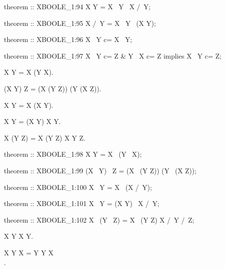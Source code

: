 \begin{paracol}{2}
\begin{mizar}
theorem :: XBOOLE_1:94
  X \/ Y = X \+\ Y \+\ X /\ Y;

theorem :: XBOOLE_1:95
  X /\ Y = X \+\ Y \+\ (X \/ Y);

theorem :: XBOOLE_1:96
  X \ Y c= X \+\ Y;

theorem :: XBOOLE_1:97
  X \ Y c= Z & Y \ X c= Z 
  implies X \+\ Y c= Z;
\end{mizar}

\switchcolumn*\ensurevspace{5cm}

\begin{theorem}
  X \cup Y = X \dotminus (Y \setminus X).
\end{theorem}

\begin{theorem}
  (X \dotminus Y) \setminus Z = (X \setminus (Y \cup Z)) \cup (Y \setminus (X \cup Z)).
\end{theorem}

\begin{theorem}
  X \setminus Y = X \dotminus (X \cap Y).
\end{theorem}

\begin{theorem}
  X \dotminus Y = (X \cup Y) \setminus X \cap Y.
\end{theorem}

\begin{theorem}
  X \setminus (Y \dotminus Z) = X \setminus (Y \cup Z) \cup X \cap Y \cap Z.
\end{theorem}

\switchcolumn

\begin{mizar}
theorem :: XBOOLE_1:98
  X \/ Y = X \+\ (Y \ X);

theorem :: XBOOLE_1:99
  (X \+\ Y) \ Z
  = (X \ (Y \/ Z)) \/ (Y \ (X \/ Z));

theorem :: XBOOLE_1:100
  X \ Y = X \+\ (X /\ Y);

theorem :: XBOOLE_1:101
  X \+\ Y = (X \/ Y) \ X /\ Y;

theorem :: XBOOLE_1:102
  X \ (Y \+\ Z) 
  = X \ (Y \/ Z) \/ X /\ Y /\ Z;
\end{mizar}

\switchcolumn*\ensurevspace{5cm}

\begin{theorem}
  X \cap Y \misses X \dotminus Y.
\end{theorem}

\begin{theorem+}
  X \propersubset Y \lor X = Y \lor Y \propersubset X\\
  \iff {}.
\end{theorem+}


\end{paracol}

